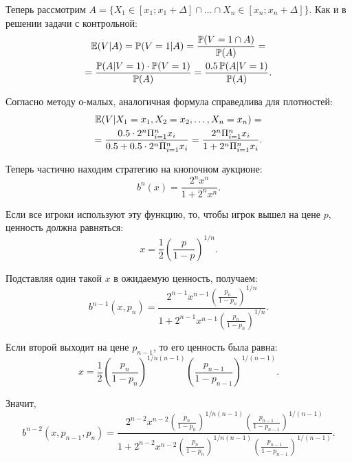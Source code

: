 \begin{enumerate}
Теперь рассмотрим $ A=\{X_{1}\in[x_{1};x_{1}+\Delta] \cap \ldots  \cap X_{n}\in[x_{n};x_{n}+\Delta]\} $. Как и в решении задачи с контрольной:
\begin{multline}
\operatorname{\mathbb{E}}(V|A)=\operatorname{\mathbb{P}}(V=1|A)=\frac{\operatorname{\mathbb{P}}(V=1 \cap A)}{\operatorname{\mathbb{P}}(A)}=\\
=\frac{\operatorname{\mathbb{P}}(A|V=1)\cdot \operatorname{\mathbb{P}}(V=1)}{\operatorname{\mathbb{P}}(A)}=\frac{0.5\operatorname{\mathbb{P}}(A|V=1)}{\operatorname{\mathbb{P}}(A)}.
\end{multline}

Согласно методу о-малых, аналогичная формула справедлива для плотностей:
\begin{multline}
\operatorname{\mathbb{E}}(V|X_{1}=x_{1},X_{2}=x_{2},\ldots ,X_{n}=x_{n})=\\
=\frac{0.5\cdot 2^{n}\Pi_{i=1}^{n}x_{i}}{0.5+0.5\cdot 2^{n}\Pi_{i=1}^{n}x_{i}}
=\frac{2^{n}\Pi_{i=1}^{n}x_{i}}{1+ 2^{n}\Pi_{i=1}^{n}x_{i}}.
\end{multline}

Теперь частично находим стратегию на кнопочном аукционе:
\begin{equation}
b^{n}(x)=\frac{2^{n}x^{n}}{1+2^{n}x^{n}}.
\end{equation}

Если все игроки используют эту функцию, то, чтобы игрок вышел на цене $ p $, ценность должна равняться:
\begin{equation}
x=\frac{1}{2}\left(\frac{p}{1-p} \right)^{1/n}.
\end{equation}

Подставляя один такой $ x $ в ожидаемую ценность, получаем:
\begin{equation}
b^{n-1}(x,p_{n})=\frac{2^{n-1}x^{n-1}\left(\frac{p_{n}}{1-p_{n}} \right)^{1/n}}{1+2^{n-1}x^{n-1}\left(\frac{p_{n}}{1-p_{n}} \right)^{1/n}}.
\end{equation}

Если второй выходит на цене $ p_{n-1} $, то его ценность была равна:
\begin{equation}
x=\frac{1}{2}\left(\frac{p_{n}}{1-p_{n}} \right)^{1/n(n-1)}\left(\frac{p_{n-1}}{1-p_{n-1}} \right)^{1/(n-1)}.
\end{equation}

Значит,
\begin{equation}
b^{n-2}(x,p_{n-1},p_{n})=\frac{2^{n-2}x^{n-2}\left(\frac{p_{n}}{1-p_{n}} \right)^{1/n(n-1)}\left(\frac{p_{n-1}}{1-p_{n-1}} \right)^{1/(n-1)}}{1+2^{n-2}x^{n-2}\left(\frac{p_{n}}{1-p_{n}} \right)^{1/n(n-1)}\left(\frac{p_{n-1}}{1-p_{n-1}} \right)^{1/(n-1)}}.
\end{equation}



\end{enumerate}
